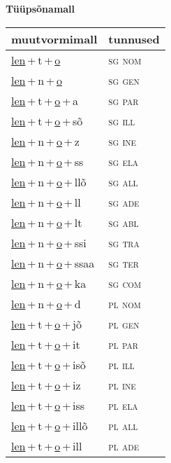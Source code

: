
\vspace{1.8em}
\begin{minipage}{\textwidth}
\textbf{Tüüpsõnamall \,}\\

\begin{sideways}
\begin{tabular}{l l}
muutvormimall & tunnused \\
\hline
\underline{len}\,+\,t\,+\,\underline{o} & \textsc{ sg nom } \\
\underline{len}\,+\,n\,+\,\underline{o} & \textsc{ sg gen } \\
\underline{len}\,+\,t\,+\,\underline{o}\,+\,a & \textsc{ sg par } \\
\underline{len}\,+\,t\,+\,\underline{o}\,+\,sõ & \textsc{ sg ill } \\
\underline{len}\,+\,n\,+\,\underline{o}\,+\,z & \textsc{ sg ine } \\
\underline{len}\,+\,n\,+\,\underline{o}\,+\,ss & \textsc{ sg ela } \\
\underline{len}\,+\,n\,+\,\underline{o}\,+\,llõ & \textsc{ sg all } \\
\underline{len}\,+\,n\,+\,\underline{o}\,+\,ll & \textsc{ sg ade } \\
\underline{len}\,+\,n\,+\,\underline{o}\,+\,lt & \textsc{ sg abl } \\
\underline{len}\,+\,n\,+\,\underline{o}\,+\,ssi & \textsc{ sg tra } \\
\underline{len}\,+\,n\,+\,\underline{o}\,+\,ssaa & \textsc{ sg ter } \\
\underline{len}\,+\,n\,+\,\underline{o}\,+\,ka & \textsc{ sg com } \\
\underline{len}\,+\,n\,+\,\underline{o}\,+\,d & \textsc{ pl nom } \\
\underline{len}\,+\,t\,+\,\underline{o}\,+\,jõ & \textsc{ pl gen } \\
\underline{len}\,+\,t\,+\,\underline{o}\,+\,it & \textsc{ pl par } \\
\underline{len}\,+\,t\,+\,\underline{o}\,+\,isõ & \textsc{ pl ill } \\
\underline{len}\,+\,t\,+\,\underline{o}\,+\,iz & \textsc{ pl ine } \\
\underline{len}\,+\,t\,+\,\underline{o}\,+\,iss & \textsc{ pl ela } \\
\underline{len}\,+\,t\,+\,\underline{o}\,+\,illõ & \textsc{ pl all } \\
\underline{len}\,+\,t\,+\,\underline{o}\,+\,ill & \textsc{ pl ade } \\

\end{tabular}
\end{sideways}
\end{minipage}

